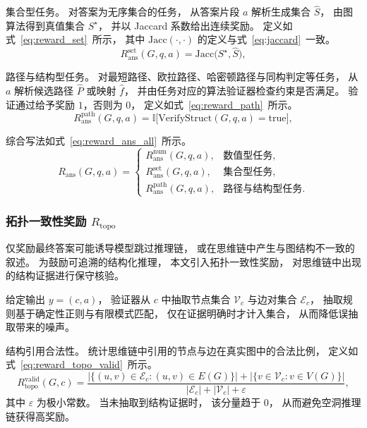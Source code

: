 {集合型任务。}
对答案为无序集合的任务，
从答案片段 \(a\) 解析生成集合 $\hat S$，
由图算法得到真值集合 $S^\star$，
并以 Jaccard 系数给出连续奖励。
定义如式~\ref{eq:reward_set}\ 所示，
其中 $\mathrm{Jacc}(\cdot,\cdot)$ 的定义与式~\ref{eq:jaccard}\ 一致。
\begin{equation}
  R_{\mathrm{ans}}^{\mathrm{set}}(G,q,a)
  =
  \mathrm{Jacc}\big(S^\star,\hat{S}\big),
  \label{eq:reward_set}
\end{equation}

{路径与结构型任务。}
对最短路径、欧拉路径、哈密顿路径与同构判定等任务，
从 $a$ 解析候选路径 $\hat P$ 或映射 $\hat f$，
并由任务对应的算法验证器检查约束是否满足。
验证通过给予奖励 $1$，否则为 $0$，
定义如式~\ref{eq:reward_path}\ 所示。
\begin{equation}
  R_{\mathrm{ans}}^{\mathrm{path}}(G,q,a)
  =
  \mathbb{I}\big[\mathrm{VerifyStruct}(G,q,a)=\mathrm{true}\big],
  \label{eq:reward_path}
\end{equation}

综合写法如式~\ref{eq:reward_ans_all}\ 所示。
\begin{equation}
  R_{\mathrm{ans}}(G,q,a)
  =
  \begin{cases}
    R_{\mathrm{ans}}^{\mathrm{num}}(G,q,a),  & \text{数值型任务}, \\
    R_{\mathrm{ans}}^{\mathrm{set}}(G,q,a),  & \text{集合型任务}, \\
    R_{\mathrm{ans}}^{\mathrm{path}}(G,q,a), & \text{路径与结构型任务}.
  \end{cases}
  \label{eq:reward_ans_all}
\end{equation}

\subsubsection{拓扑一致性奖励 $R_{\mathrm{topo}}$}
\label{subsubsec:reward_topo}

仅奖励最终答案可能诱导模型跳过推理链，
或在思维链中产生与图结构不一致的叙述。
为鼓励可追溯的结构化推理，
本文引入拓扑一致性奖励，
对思维链中出现的结构证据进行保守核验。

给定输出 $y=(c,a)$，
验证器从 $c$ 中抽取节点集合 $\mathcal{V}_c$ 与边对集合 $\mathcal{E}_c$，
抽取规则基于确定性正则与有限模式匹配，
仅在证据明确时才计入集合，
从而降低误抽取带来的噪声。

{结构引用合法性。}
统计思维链中引用的节点与边在真实图中的合法比例，
定义如式~\ref{eq:reward_topo_valid}\ 所示。
\begin{equation}
  R_{\mathrm{topo}}^{\mathrm{valid}}(G,c)
  =
  \frac{
    \big|\{(u,v)\in\mathcal{E}_c : (u,v)\in E(G)\}\big|
    +
    \big|\{v\in\mathcal{V}_c : v\in V(G)\}\big|
  }{
    |\mathcal{E}_c| + |\mathcal{V}_c| + \varepsilon
  },
  \label{eq:reward_topo_valid}
\end{equation}
其中 $\varepsilon$ 为极小常数。
当未抽取到结构证据时，
该分量趋于 $0$，
从而避免空洞推理链获得高奖励。

